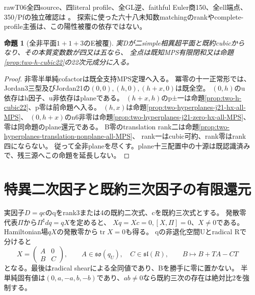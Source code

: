 \documentclass[a4paper,11pt]{ltjsarticle}
\newtheorem{proposition}{命題}[section]
\theoremstyle{definition}
\begin{document}
rawT06全四source、四literal profile、全GL逆、faithful Euler商150、全ell端点、350/Pfの独立確認は
。
探索に使った六十八未知数matchingのrankやcomplete-profile主張は、この陽性被覆の依存ではない。

\begin{proposition}[全非平面$1+1+3$のE被覆]\label{prop:two-hyperplanes-cubic-nonplane-all-E}
実Dが二simple相異超平面と既約cubicからなり、その本質変数数が四又は五なら、
全点は既知MPS有限閉和又は命題\ref{prop:two-h-cubic22}の22次元成分に入る。
\end{proposition}
\begin{proof}
非零半単純cofactorは既全支持MPS定理へ入る。
冪零の十一正常形では、Jordan3三型及びJordan21の$(0,0),(h,0),(h+x,0)$は既全空。
$(0,h)$のu依存はh因子、u非依存はplaneである。
$(h+x,h)$のp±一は命題\ref{prop:two-h-cubic22}、p零は前命題へ入る。
$(h,x)$は命題\ref{prop:two-hyperplanes-j21-hx-all-MPS}、
$(0,h+x)$のn6非零は命題\ref{prop:two-hyperplanes-j21-zero-hx-all-MPS}、零は同命題のplane還元である。
B零のtranslation rank二は命題\ref{prop:two-hyperplanes-translation-nonplane-all-MPS}、
rank一はcubic可約、rank零はrank四にならない。
従って全非planeを尽くす。plane十三配置中の十源は既認識済みで、残三源へこの命題を延長しない。
\end{proof}

\section{特異二次因子と既約三次因子の有限還元}
実因子$D=qc$のqをrank3または4の既約二次式、cを既約三次式とする。
発散零代表$\Pi$から$\Pi^\sharp dq=qX$を定めると、
$Xq=Xc=0,[X,\Pi]=0$、$X\ne0$である。
Hamiltonian場$qX$の発散零から$\operatorname{tr}X=0$も得る。
qの非退化空間Uとradical Rで分けると
\[
 X=\begin{pmatrix}A&0\\ B&C\end{pmatrix},\qquad
 A\in\mathfrak{so}(q_U),\quad C\in\mathfrak{sl}(R),\qquad
 B\mapsto B+TA-CT
\]
となる。最後はradical shearによる全同値であり、Bを勝手に零に置かない。
半単純固有値は$(0,a,-a,b,-b)$であり、$ab\ne0$なら既約三次の存在は絶対比2を強制する。
\end{document}
